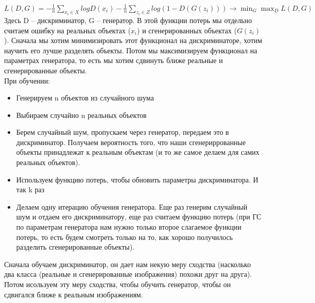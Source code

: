 $L(D,G) = -\displaystyle\frac{1}{n}\sum\limits_{x_{i} \in X}log D(x_{i}) -\displaystyle\frac{1}{n}\sum\limits_{z_{i} \in Z}log(1 - D(G(z_{i}))) \rightarrow \min_{G} \max_{D} L(D,G) $ \\

Здесь D -- дискриминатор, G -- генератор. В этой функции потерь мы отдельно считаем ошибку на реальных объектах ($x_{i}$) и сгенерированных объектах ($G(z_{i})$). Сначала мы хотим минимизировать этот функционал на дискриминаторе, хотим научить его лучше разделять объекты. Потом мы максимизируем функционал на параметрах генератора, то есть мы хотим сдвинуть ближе реальные и сгенерированные объекты. \\

При обучении: \\ 
\begin{itemize}\setlength\itemsep{0.2em}
    \item Генерируем n объектов из случайного шума 
    \item Выбираем случайно n реальных объектов \item Берем случайный шум, пропускаем через генератор, передаем это в дискриминатор. Получаем вероятность того, что наши сгенериррованные объекты принадлежат к реальным объектам (и то же самое делаем для самих реальных объектов). 
    \item Используем функцию потерь, чтобы обновить параметры дискриминатора. И так k раз 
    \item Делаем одну итерацию обучения генератора. Еще раз генерим случайный шум и отдаем его дискриминатору, еще раз считаем функцию потерь (при ГС по параметрам генератора нам нужно только второе слагаемое функции потерь, то есть будем смотреть только на то, как хорошо получилось разделить сгенерированные объекты). 
\end{itemize}

Сначала обучаем дискриминатор, он дает нам некую меру сходства (насколько два класса (реальные и сгенерированные изображения) похожи друг на друга). Потом исользуем эту меру сходства, чтобы обучить генератор, чтобы он сдвигался ближе к реальным изображениям. 
